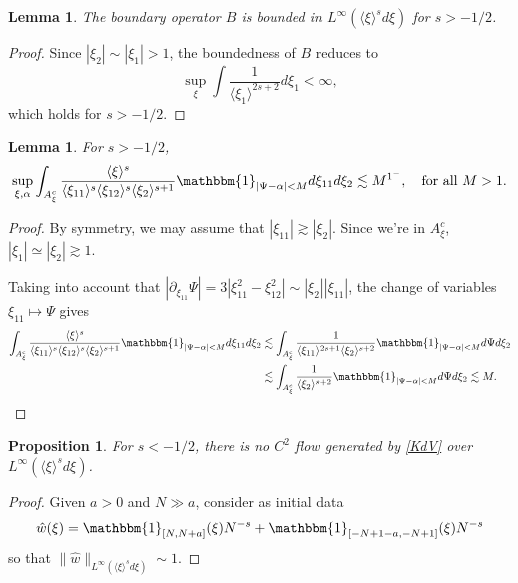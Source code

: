 \documentclass[a4paper, 11pt]{amsart}
\newcommand{\jap}[1]{\langle #1 \rangle}
\newcommand{\psia}{\mathbbm{1}_{|\Psi-\alpha|<M}}
\theoremstyle{plain}
\newtheorem{prop}[thm]{Proposition}
\newtheorem{lem}[thm]{Lemma}
\theoremstyle{definition}
\theoremstyle{remark}
\newcommand{\5}{\text{V}}
\numberwithin{equation}{section}
\theoremstyle{mytheoremstyle} \newtheorem{nota}[thm]{Remark}
\theoremstyle{mytheoremstyle} \newtheorem{exemplo}[thm]{Example}
\begin{document}
{\begin{lem}
   The boundary operator $B$ is bounded in $L^\infty(\jap{\xi}^sd\xi)$ for $s>-1/2$.
\end{lem}
\begin{proof}
    Since $|\xi_2|\sim |\xi_1|>1$, the boundedness of $B$ reduces to
    $$
    \sup_\xi\int \frac{1}{\jap{\xi_1}^{2s+2}}d\xi_1<\infty,
    $$
    which holds for $s>-1/2$.
\end{proof}

\begin{lem}
    For $s>-1/2$,
    $$
    \sup_{\xi,\alpha} \int_{A_\xi^c} \frac{\jap{\xi}^s}{\jap{\xi_{11}}^s\jap{\xi_{12}}^s\jap{\xi_2}^{s+1}}\psia d\xi_{11} d\xi_{2} \lesssim M^{1^-}, \quad \mbox{for all }M>1.
    $$
\end{lem}
\begin{proof}
    By symmetry, we may assume that $|\xi_{11}|\gtrsim |\xi_{2}|$. Since we're in $A_\xi^c$, $|\xi_1|\simeq |\xi_2|\gtrsim 1$.

    Taking into account that
    $|\partial_{\xi_{11}}\Psi|=3|\xi_{11}^2-\xi_{12}^2|\sim |\xi_2||\xi_{11}|$, the change of variables $\xi_{11}\mapsto \Psi$ gives
    \begin{align*}
        \int_{A_\xi^c} \frac{\jap{\xi}^s}{\jap{\xi_{11}}^s\jap{\xi_{12}}^s\jap{\xi_2}^{s+1}}\psia d\xi_{11} d\xi_{2} &\lesssim \int_{A_\xi^c} \frac{1}{\jap{\xi_{11}}^{2s+1}\jap{\xi_2}^{s+2}}\psia d\Psi d\xi_{2} \\ &\lesssim \int_{A_\xi^c} \frac{1}{\jap{\xi_2}^{s+2}}\psia d\Psi d\xi_{2} \lesssim M.
    \end{align*}
\end{proof}


\begin{prop}
    For $s<-1/2$, there is no $C^2$ flow generated by \eqref{KdV} over $L^\infty(\jap{\xi}^sd\xi)$.
\end{prop}
\begin{proof}
    Given $a>0$ and $N\gg a$, consider as initial data
    $$
    \hat{w}(\xi)=\mathbbm{1}_{[N, N+a]}(\xi)N^{-s} + \mathbbm{1}_{[-N+1-a, -N+1]}(\xi)N^{-s}
    $$
    so that $\|\hat{w}\|_{L^\infty(\jap{\xi}^sd\xi)}\sim 1$.


\end{proof}}
\end{document}
